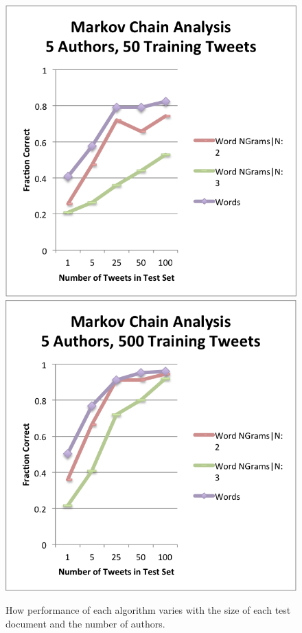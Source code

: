 \documentclass[pageno]{jpaper}
\begin{document}
\begin{figure}[h!]
\begin{center}
\includegraphics*[scale=.75]{A2}
\includegraphics*[scale=.75]{A4}
\end{center}
\caption{How performance of each algorithm varies with the size of each test document and the number of authors.}
\label{fig:VaryingTestMarkov}
\end{figure}
\end{document}
